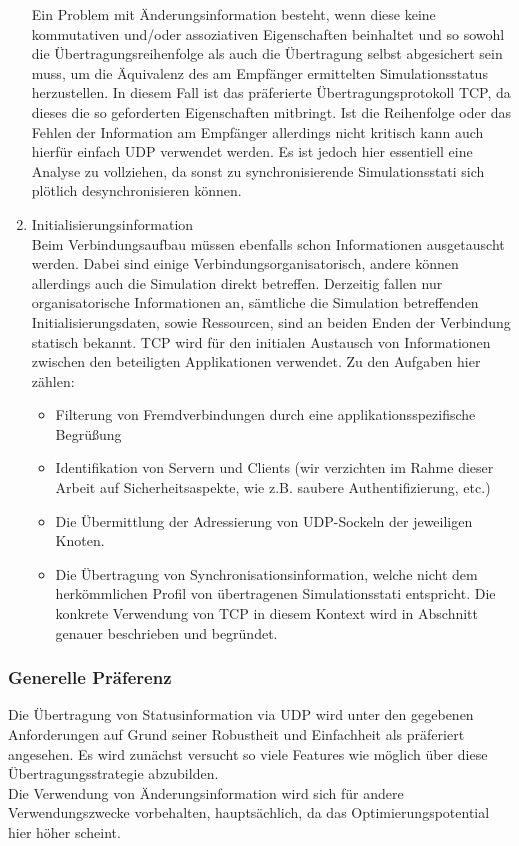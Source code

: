 \documentclass[11pt,twoside,a4paper]{article}
\begin{document}
\begin{enumerate}
Ein Problem mit Änderungsinformation besteht, wenn diese keine kommutativen und/oder assoziativen Eigenschaften beinhaltet und so sowohl die Übertragungsreihenfolge als auch die Übertragung selbst abgesichert sein muss, um die Äquivalenz des am Empfänger ermittelten Simulationsstatus herzustellen. In diesem Fall ist das präferierte Übertragungsprotokoll TCP, da dieses die so geforderten Eigenschaften mitbringt. Ist die Reihenfolge oder das Fehlen der Information am Empfänger allerdings nicht kritisch kann auch hierfür einfach UDP verwendet werden. Es ist jedoch hier essentiell eine Analyse zu vollziehen, da sonst zu synchronisierende Simulationsstati sich plötlich desynchronisieren können.
\item Initialisierungsinformation\\
Beim Verbindungsaufbau müssen ebenfalls schon Informationen ausgetauscht werden. Dabei sind einige Verbindungsorganisatorisch, andere können allerdings auch die Simulation direkt betreffen. 
Derzeitig fallen nur organisatorische Informationen an, sämtliche die Simulation betreffenden Initialisierungsdaten, sowie Ressourcen, sind an beiden Enden der Verbindung statisch bekannt.
TCP wird für den initialen Austausch von Informationen zwischen den beteiligten Applikationen verwendet. Zu den Aufgaben hier zählen:
\begin{itemize}
\item Filterung von Fremdverbindungen durch eine applikationsspezifische Begrüßung
\item Identifikation von Servern und Clients (wir verzichten im Rahme dieser Arbeit auf Sicherheitsaspekte, wie z.B. saubere Authentifizierung, etc.)
\item Die Übermittlung der Adressierung von UDP-Sockeln der jeweiligen Knoten.
\item Die Übertragung von Synchronisationsinformation, welche nicht dem herkömmlichen Profil von übertragenen Simulationsstati entspricht. Die konkrete Verwendung von TCP in diesem Kontext wird in Abschnitt %
genauer beschrieben und begründet.
\end{itemize}
\end{enumerate}

\subsubsection{Generelle Präferenz}
Die Übertragung von Statusinformation via UDP wird unter den gegebenen Anforderungen auf Grund seiner Robustheit und Einfachheit als präferiert angesehen. Es wird zunächst versucht so viele Features wie möglich über diese Übertragungsstrategie abzubilden.\\
Die Verwendung von Änderungsinformation wird sich für andere Verwendungszwecke vorbehalten, hauptsächlich, da das Optimierungspotential hier höher scheint.
\end{document}
